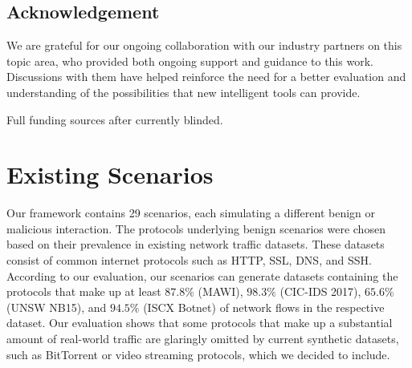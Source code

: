 \documentclass[runningheads]{llncs}
\begin{document}



\subsection{Acknowledgement}
We are grateful for our ongoing collaboration with our industry partners on this topic area, who provided both ongoing support and guidance to this work. Discussions with them have helped reinforce the need for a better evaluation and understanding of the possibilities that new intelligent tools can provide.

Full funding sources after currently blinded.


 


\appendix


\section{Existing Scenarios}\label{Sec:ExistScen}

Our framework contains 29 scenarios, each simulating a different benign or malicious interaction. The protocols underlying benign scenarios were chosen based on their prevalence in existing network traffic datasets. %
These datasets consist of common internet protocols such as HTTP, SSL, DNS, and SSH. According to our evaluation, our scenarios can generate datasets containing the protocols that make up at least $87.8\%$ (MAWI), $98.3\%$ (CIC-IDS 2017), $65.6\%$ (UNSW NB15), and $94.5\%$ (ISCX Botnet) of network flows in the respective dataset.
Our evaluation shows that some protocols that make up a substantial amount of real-world traffic are glaringly omitted by current synthetic datasets, such as BitTorrent or video streaming protocols, which we decided to include. 
\end{document}
